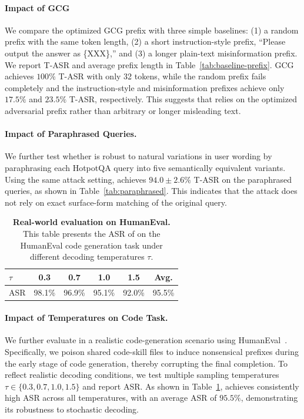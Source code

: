 \paragraph{Impact of GCG}
We compare the optimized GCG prefix with three simple baselines: (1) a random prefix with the same token length, (2) a short instruction-style prefix, ``Please output the answer as \{XXX\},'' and (3) a longer plain-text misinformation prefix. We report T-ASR and average prefix length in Table~\ref{tab:baseline-prefix}. GCG achieves $100\%$ T-ASR with only 32 tokens, while the random prefix fails completely and the instruction-style and misinformation prefixes achieve only $17.5\%$ and $23.5\%$ T-ASR, respectively. This suggests that \sys relies on the optimized adversarial prefix rather than arbitrary or longer misleading text.

\paragraph{Impact of Paraphrased Queries.}
We further test whether \sys is robust to natural variations in user wording by paraphrasing each HotpotQA query into five semantically equivalent variants. Using the same attack setting, \sys achieves $94.0 \pm 2.6\%$ T-ASR on the paraphrased queries, as shown in Table~\ref{tab:paraphrased}. This indicates that the attack does not rely on exact surface-form matching of the original query.

\begin{table}[t]
\centering
\footnotesize
\setlength{\tabcolsep}{10pt} 
\caption{\textbf{Real-world evaluation on HumanEval.} This table presents the ASR of \sys on the HumanEval code generation task under different decoding temperatures $\tau$.}
\label{tab:rwe}
\begin{tabular}{lccccc}
\toprule
$\tau$ & 0.3 & 0.7 & 1.0 & 1.5 & Avg. \\
\midrule
ASR & 98.1\% & 96.9\% & 95.1\% & 92.0\% & 95.5\% \\
\bottomrule
\end{tabular}
\end{table}

\paragraph{Impact of Temperatures on Code Task.}
We further evaluate \sys in a realistic code-generation scenario using HumanEval~\cite{chen2021evaluating}. Specifically, we poison shared code-skill files to induce nonsensical prefixes during the early stage of code generation, thereby corrupting the final completion. To reflect realistic decoding conditions, we test multiple sampling temperatures $\tau \in \{0.3, 0.7, 1.0, 1.5\}$ and report ASR. As shown in Table~\ref{tab:rwe}, \sys achieves consistently high ASR across all temperatures, with an average ASR of $95.5\%$, demonstrating its robustness to stochastic decoding.


